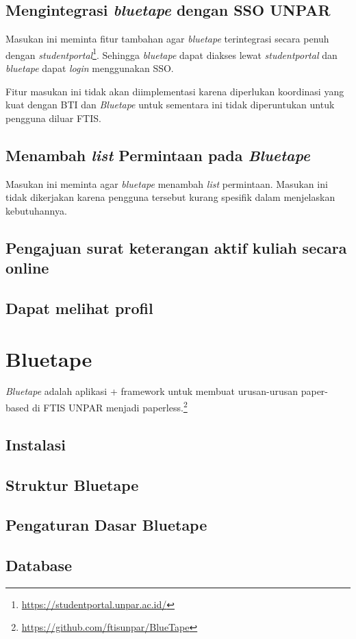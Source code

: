 \subsection{Mengintegrasi \textit{bluetape} dengan SSO UNPAR}
Masukan ini meminta fitur tambahan agar \textit{bluetape} terintegrasi secara penuh dengan \textit{studentportal}\footnote{\url{https://studentportal.unpar.ac.id/}}. Sehingga \textit{bluetape} dapat diakses lewat \textit{studentportal} dan \textit{bluetape} dapat \textit{login} menggunakan SSO.

Fitur masukan ini tidak akan diimplementasi karena diperlukan koordinasi yang kuat dengan BTI dan \textit{Bluetape} untuk sementara ini tidak diperuntukan untuk pengguna diluar FTIS.

\subsection{Menambah \textit{list} Permintaan pada \textit{Bluetape}}
Masukan ini meminta agar \textit{bluetape} menambah \textit{list} permintaan. Masukan ini tidak dikerjakan karena pengguna tersebut kurang spesifik dalam menjelaskan kebutuhannya.

\subsection{Pengajuan surat keterangan aktif kuliah secara online}
\subsection{Dapat melihat profil }

\section{Bluetape}

\textit{Bluetape} adalah aplikasi + framework untuk membuat urusan-urusan paper-based di FTIS UNPAR menjadi paperless.\footnote{\url{https://github.com/ftisunpar/BlueTape}}

\subsection{Instalasi}

\subsection{Struktur Bluetape}

\subsection{Pengaturan Dasar Bluetape}

\subsection{Database}